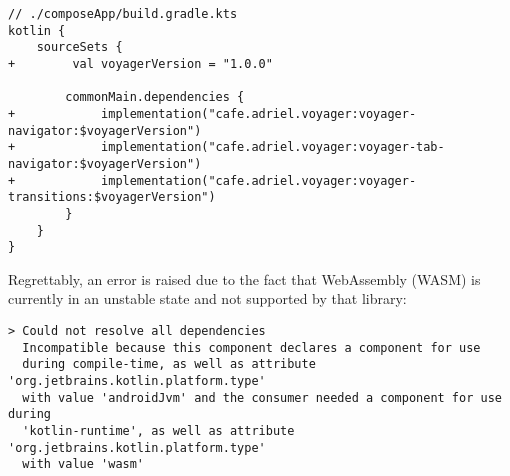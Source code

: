 \begin{lstlisting}
// ./composeApp/build.gradle.kts
kotlin {
    sourceSets {
+        val voyagerVersion = "1.0.0"

        commonMain.dependencies {
+            implementation("cafe.adriel.voyager:voyager-navigator:$voyagerVersion")
+            implementation("cafe.adriel.voyager:voyager-tab-navigator:$voyagerVersion")
+            implementation("cafe.adriel.voyager:voyager-transitions:$voyagerVersion")
        }
    }
}
\end{lstlisting}

\noindent Regrettably, an error is raised due to the fact that WebAssembly (WASM) is currently in an unstable state
and not supported by that library:

\begin{lstlisting}
> Could not resolve all dependencies
  Incompatible because this component declares a component for use 
  during compile-time, as well as attribute 'org.jetbrains.kotlin.platform.type' 
  with value 'androidJvm' and the consumer needed a component for use during 
  'kotlin-runtime', as well as attribute 'org.jetbrains.kotlin.platform.type' 
  with value 'wasm'
\end{lstlisting}
